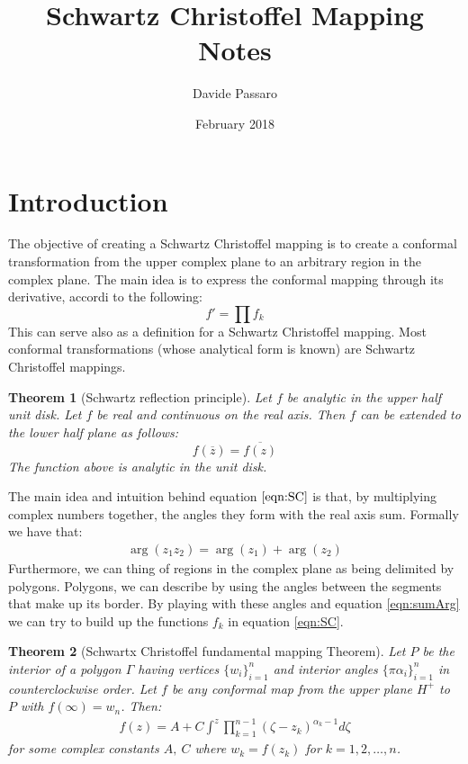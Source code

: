 \documentclass[10pt, a4paper]{article}
\title{Schwartz Christoffel Mapping Notes}
\author{Davide Passaro}
\date{February 2018}
\theoremstyle{plain}
\newtheorem{thm}{Theorem}
\theoremstyle{definition}
\theoremstyle{remark}
\begin{document}
\maketitle

\section{Introduction}
The objective of creating a Schwartz Christoffel mapping is to create a conformal transformation from the upper complex plane to an arbitrary region in the complex plane. The main idea is to express the conformal mapping through its derivative, accordi to the following:
\begin{equation}
    \label{eqn:SC}
    f'=\prod f_k
\end{equation}
This can serve also as a definition for a Schwartz Christoffel mapping. Most conformal transformations (whose analytical form is known) are Schwartz Christoffel mappings.
\begin{thm}[Schwartz reflection principle]
    Let $f $ be analytic in the upper half unit disk. Let $f $ be real and continuous on the real axis. Then $ f $ can be extended to the lower half plane as follows:
    \begin{equation}
        f(\overline{z})=\overline{f(z)}
    \end{equation}
    The function above is analytic in the unit disk.
\end{thm}
The main idea and intuition behind equation $ \ref{eqn:SC} $ is that, by multiplying complex numbers together, the angles they form with the real axis sum. Formally we have that:
\begin{gather}
\label{eqn:sumArg}
\arg(z_1z_2)=\arg(z_1)+\arg(z_2)
\end{gather}
Furthermore, we can thing of regions in the complex plane as being delimited by polygons. Polygons, we can describe by using the angles between the segments that make up its border. By playing with these angles and equation \ref{eqn:sumArg} we can try to build up the functions $ f_k $ in equation \ref{eqn:SC}.
\begin{thm}[Schwartx Christoffel fundamental mapping Theorem]
	\label{thm:SCfundamental}
	Let $ P $ be the interior of a polygon $ \Gamma $ having vertices $ \{w_i\}_{i=1}^n $ and interior angles $ \{\pi\alpha_{i}\}_{i=1}^n $ in counterclockwise order. Let $ f $ be any conformal map from the upper plane $ H^+ $ to $ P $ with $ f(\infty)=w_n $. Then:
	\begin{gather}
		\label{eqn:SCform}
		f(z)=A+C\int^z\prod_{k=1}^{n-1}(\zeta-z_k)^{\alpha_k-1}d\zeta
	\end{gather}
	for some complex constants $ A,\ C $ where $ w_k=f(z_k) $ for $ k=1,2,\dots,n $.
\end{thm}
\end{document}
